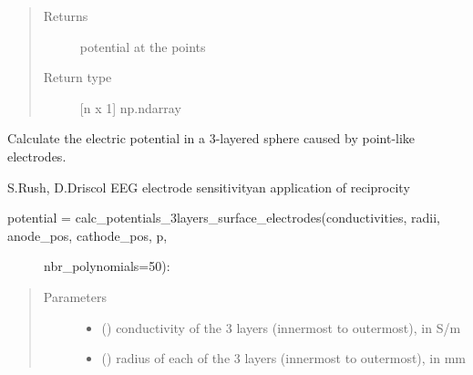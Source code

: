 \documentclass[letterpaper,10pt,english,openany,oneside]{sphinxmanual}
\begin{document}
\begin{fulllineitems}
\begin{quote}
\begin{description}
\begin{itemize}
\end{itemize}

\item[{Returns}] \leavevmode
{} \textendash{} potential at the points

\item[{Return type}] \leavevmode
{[}n x 1{]} np.ndarray

\end{description}\end{quote}

\end{fulllineitems}


\begin{fulllineitems}
\label{\detokenize{pygpc:pygpc.testfun.calc_potentials_3layers_surface_electrodes}}
Calculate the electric potential in a 3-layered sphere caused by point-like electrodes.

S.Rush, D.Driscol EEG electrode sensitivity\textendash{}an application of reciprocity
\begin{description}
\item[{potential = calc\_potentials\_3layers\_surface\_electrodes(conductivities, radii, anode\_pos, cathode\_pos, p,}] \leavevmode
nbr\_polynomials=50):

\end{description}
\begin{quote}\begin{description}
\item[{Parameters}] \leavevmode\begin{itemize}
\item {} 
 (\sphinxstyleliteralemphasis{\sphinxupquote{{[}}}\sphinxstyleliteralemphasis{\sphinxupquote{{]} }}) \textendash{} conductivity of the 3 layers (innermost to outermost), in S/m

\item {} 
 (\sphinxstyleliteralemphasis{\sphinxupquote{{[}}}\sphinxstyleliteralemphasis{\sphinxupquote{{]} }}) \textendash{} radius of each of the 3 layers (innermost to outermost), in mm


\end{itemize}
\end{description}
\end{quote}
\end{fulllineitems}
\end{document}
